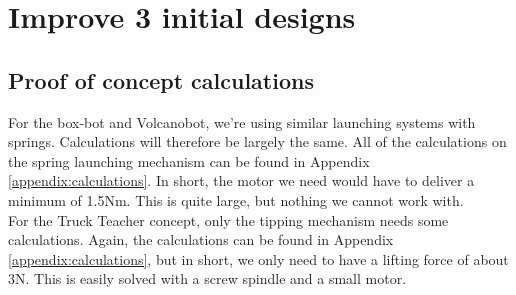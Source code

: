 \documentclass[11pt,twoside,a4paper]{report}
\begin{document}
\chapter{Improve 3 initial designs}
\section{Proof of concept calculations}
For the box-bot and Volcanobot, we\rq{}re using similar launching systems with springs. Calculations will therefore be largely the same.
All of the calculations on the spring launching mechanism can be found in Appendix \ref{appendix:calculations}. In short, the motor we need would have to deliver a minimum of 1.5Nm. This is quite large, but nothing we cannot work with.\\
For the Truck Teacher concept, only the tipping mechanism needs some calculations. Again, the calculations can be found in Appendix \ref{appendix:calculations}, but in short, we only need to have a lifting force of about 3N. This is easily solved with a screw spindle and a small motor.
\end{document}
